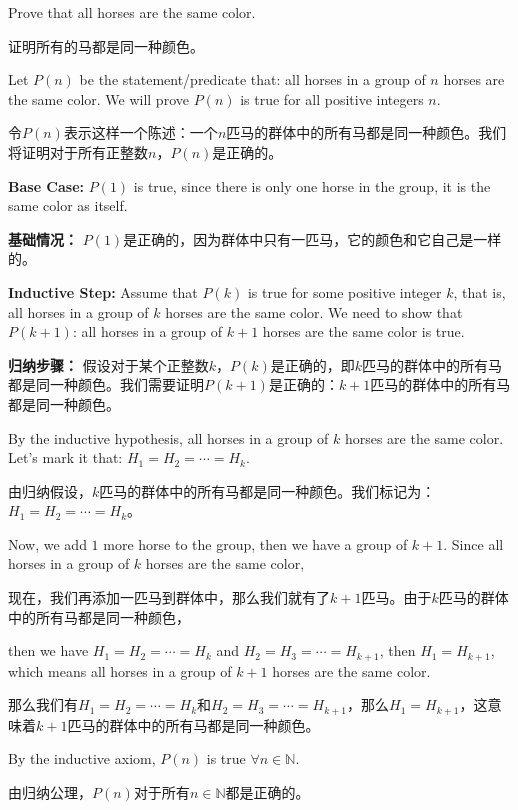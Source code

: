\documentclass{Math_Note}
\begin{document}
\begin{prb}
    Prove that all horses are the same color.

    证明所有的马都是同一种颜色。
\end{prb}

\begin{sol}
    Let $P(n)$ be the statement/predicate that: all horses in a group of $n$ horses are the same color. We will prove $P(n)$ is true for all positive integers $n$.

    令$P(n)$表示这样一个陈述：一个$n$匹马的群体中的所有马都是同一种颜色。我们将证明对于所有正整数$n$，$P(n)$是正确的。

    \textbf{Base Case:} $P(1)$ is true, since there is only one horse in the group, it is the same color as itself.
    
    \textbf{基础情况：} $P(1)$是正确的，因为群体中只有一匹马，它的颜色和它自己是一样的。

    \textbf{Inductive Step:} Assume that $P(k)$ is true for some positive integer $k$, that is, all horses in a group of $k$ horses are the same color. We need to show that $P(k+1)$: all horses in a group of $k+1$ horses are the same color is true.

    \textbf{归纳步骤：} 假设对于某个正整数$k$，$P(k)$是正确的，即$k$匹马的群体中的所有马都是同一种颜色。我们需要证明$P(k+1)$是正确的：$k+1$匹马的群体中的所有马都是同一种颜色。

    By the inductive hypothesis, all horses in a group of $k$ horses are the same color. Let's mark it that: $H_{1}=H_{2}=\cdots=H_{k}$.
    
    由归纳假设，$k$匹马的群体中的所有马都是同一种颜色。我们标记为：$H_{1}=H_{2}=\cdots=H_{k}$。

    Now, we add $1$ more horse to the group, then we have a group of $k+1$. Since all horses in a group of $k$ horses are the same color,

    现在，我们再添加一匹马到群体中，那么我们就有了$k+1$匹马。由于$k$匹马的群体中的所有马都是同一种颜色，

    then we have $H_{1}=H_{2}=\cdots=H_{k}$ and $H_{2}=H_{3}=\cdots=H_{k+1}$, then $H_{1}=H_{k+1}$, which means all horses in a group of $k+1$ horses are the same color.

    那么我们有$H_{1}=H_{2}=\cdots=H_{k}$和$H_{2}=H_{3}=\cdots=H_{k+1}$，那么$H_{1}=H_{k+1}$，这意味着$k+1$匹马的群体中的所有马都是同一种颜色。

    By the inductive axiom, $P(n)$ is true $\forall n \in \mathbb{N}$.
    
    由归纳公理，$P(n)$对于所有$n \in \mathbb{N}$都是正确的。
\end{sol}
\end{document}
